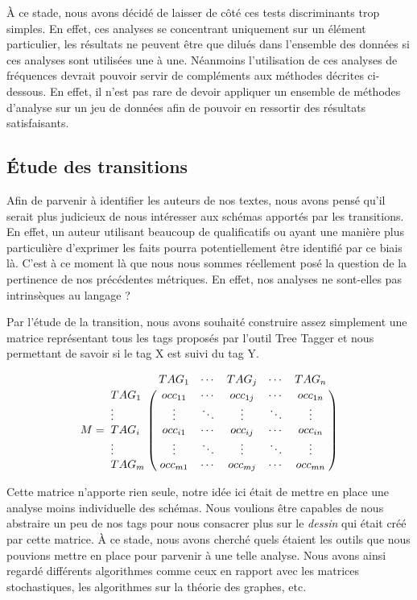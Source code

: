 \documentclass[a4paper,12pt]{report}
\begin{document}
À ce stade, nous avons décidé de laisser de côté ces tests discriminants trop simples. En effet, ces analyses se concentrant uniquement sur un élément particulier, les résultats ne peuvent être que dilués dans l'ensemble des données si ces analyses sont utilisées une à une. Néanmoins l'utilisation de ces analyses de fréquences devrait pouvoir servir de compléments aux méthodes décrites ci-dessous. En effet, il n'est pas rare de devoir appliquer un ensemble de méthodes d'analyse sur un jeu de données afin de pouvoir en ressortir des résultats satisfaisants.


\subsection{Étude des transitions}

Afin de parvenir à identifier les auteurs de nos textes, nous avons pensé qu'il serait plus judicieux de nous intéresser aux schémas apportés par les transitions. En effet, un auteur utilisant beaucoup de qualificatifs ou ayant une manière plus particulière d'exprimer les faits pourra potentiellement être identifié par ce biais là. C'est à ce moment là que nous nous sommes réellement posé la question de la pertinence de nos précédentes métriques. En effet, nos analyses ne sont-elles pas intrinsèques au langage ?

Par l'étude de la transition, nous avons souhaité construire assez simplement une matrice représentant tous les tags proposés par l'outil Tree Tagger et nous permettant de savoir si le tag X est suivi du tag Y.

\[M=\bordermatrix{
&TAG_{1}&\cdots&TAG_{j}&\cdots&TAG_{n}\cr
TAG_{1}& occ_{11} & \cdots & occ_{1j} & \cdots & occ_{1n} \cr
\vdots&\vdots&\ddots&\vdots&\ddots&\vdots\cr
TAG_{i}& occ_{i1} & \cdots & occ_{ij} & \cdots & occ_{in} \cr
\vdots&\vdots&\ddots&\vdots&\ddots&\vdots\cr
TAG_{m}& occ_{m1} & \cdots & occ_{mj} & \cdots & occ_{mn} \cr
}\]

Cette matrice n'apporte rien seule, notre idée ici était de mettre en place une analyse moins individuelle des schémas. Nous voulions être capables de nous abstraire un peu de nos tags pour nous consacrer plus sur le \textit{dessin} qui était créé par cette matrice. À ce stade, nous avons cherché quels étaient les outils que nous pouvions mettre en place pour parvenir à une telle analyse. Nous avons ainsi regardé différents algorithmes comme ceux en rapport avec les matrices stochastiques, les algorithmes sur la théorie des graphes, etc. 
\end{document}
